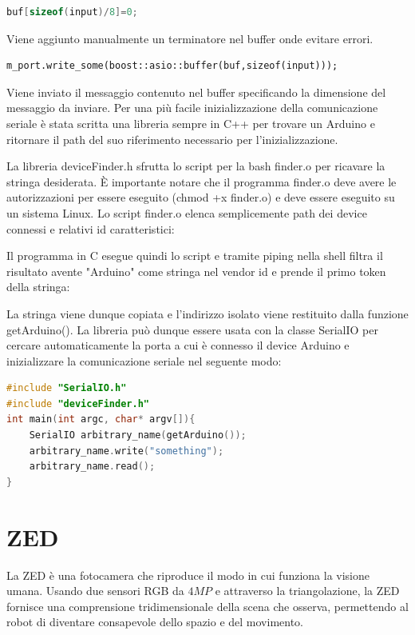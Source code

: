 \documentclass[a4paper]{article}
\begin{document}
\begin{lstlisting}[language=C++,firstnumber=27]
buf[sizeof(input)/8]=0;
\end{lstlisting}
Viene aggiunto manualmente un terminatore nel buffer onde evitare errori.

\begin{lstlisting}
m_port.write_some(boost::asio::buffer(buf,sizeof(input)));
\end{lstlisting}
Viene inviato il messaggio contenuto nel buffer specificando la dimensione del messaggio da inviare.
\newpage
Per una più facile inizializzazione della comunicazione seriale è stata scritta una libreria sempre in C++ per trovare un Arduino e ritornare il path del suo riferimento necessario per l'inizializzazione.




La libreria deviceFinder.h sfrutta lo script per la bash finder.o per ricavare la stringa desiderata.
È importante notare che il programma finder.o deve avere le autorizzazioni per essere eseguito (chmod +x finder.o) e deve essere eseguito su un sistema Linux.
Lo script finder.o elenca semplicemente path dei device connessi e relativi id caratteristici:

Il programma in C esegue quindi lo script e tramite piping nella shell filtra il risultato avente "Arduino" come stringa nel vendor id e prende il primo token della stringa:

La stringa viene dunque copiata e l'indirizzo isolato viene restituito dalla funzione getArduino().
La libreria può dunque essere usata con la classe SerialIO per cercare automaticamente la porta a cui è connesso il device Arduino e inizializzare la comunicazione seriale nel seguente modo:
\begin{lstlisting}[language=C++]
#include "SerialIO.h"
#include "deviceFinder.h"
int main(int argc, char* argv[]){
    SerialIO arbitrary_name(getArduino());
    arbitrary_name.write("something");
    arbitrary_name.read();
}
\end{lstlisting}

\newpage




\section{ZED}
La ZED è una fotocamera che riproduce il modo in cui funziona la visione umana. Usando due sensori RGB da $4MP$ e attraverso la triangolazione, la ZED fornisce una comprensione tridimensionale della scena che osserva, permettendo al robot di diventare consapevole dello spazio e del movimento.
\end{document}
